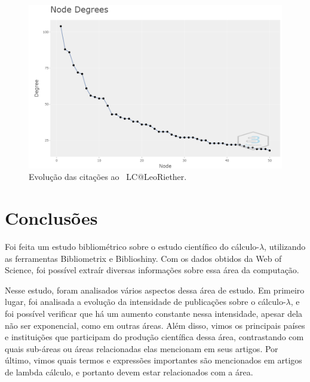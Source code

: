 \begin{figure}
    \centering
    \includegraphics[width=1\textwidth]{experiments/LeoRiether/AnaliseBibliometrica/LambdaCalculus/WoS-20220208/Images/CollaborationNetworkDegrees.png}
    \caption{Evolução das citações ao \dataset\   LC@LeoRiether.}
    \label{fig:LC@LeoRiether:CollaborationNetworkDegrees}
\end{figure}

\section{Conclusões}
Foi feita um estudo bibliométrico sobre o estudo científico do cálculo-$\lambda$, utilizando as ferramentas Bibliometrix e Biblioshiny. Com os dados obtidos da Web of Science, foi possível extraír diversas informações sobre essa área da computação.

Nesse estudo, foram analisados vários aspectos dessa área de estudo. Em primeiro lugar, foi analisada a evolução da intensidade de publicações sobre o cálculo-$\lambda$, e foi possível verificar que há um aumento constante nessa intensidade, apesar dela não ser exponencial, como em outras áreas. Além disso, vimos os principais países e instituições que participam do produção científica dessa área, contrastando com quais sub-áreas ou áreas relacionadas elas mencionam em seus artigos. Por último, vimos quais termos e expressões importantes são mencionados em artigos de lambda cálculo, e portanto devem estar relacionados com a área.
